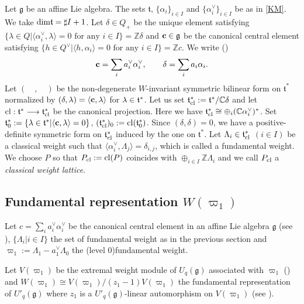 Let ${\mathfrak g}$ be an affine Lie algebra. 
The sets $\mathfrak t$, 
$\{{\alpha}_i\}_{i\in I}$ 
and $\{{\alpha}^\vee_i\}_{i\in I}$ be as in \ref{KM}. 
We take ${\rm dim}\mathfrak t=\sharp I+1$.
Let ${\delta}\in Q_+$ be the unique element 
satisfying $\{{\lambda}\in Q|{\langle} {\alpha}^\vee_i,{\lambda}{\rangle}=0
\text{ for any }i\in I\}={\mathbb Z}{\delta}$
and ${\bf c}\in {\mathfrak g}$ be the canonical central element
satisfying $\{h\in Q^\vee|{\langle} h,{\alpha}_i{\rangle}=0
\text{ for any }i\in I\}={\mathbb Z} c$.
We write (\cite[6.1]{Kac})
\[
{\bf c}=\sum_i a_i^\vee {\alpha}^\vee_i,{\qquad}
{\delta}=\sum_i a_i{\alpha}_i.
\]
Let $({\quad},{\quad})$ be the non-degenerate
$W$-invariant symmetric bilinear form on $\mathfrak t^*$
normalized by $({\delta},{\lambda})={\langle} {\bf c},{\lambda}{\rangle}$
for ${\lambda}\in\frak t^*$.
Let us set ${\mathfrak t}^*_{\rm cl}:={\mathfrak t}^*/{\mathbb C}{\delta}$ and let
${\rm cl}:{\mathfrak t}^*\longrightarrow {\mathfrak t}^*_{\rm cl}$
be the canonical projection. 
Here we have 
${\mathfrak t}^*_{\rm cl}\cong \oplus_i({\mathbb C} {\alpha}^\vee_i)^*$.
Set ${\mathfrak t}^*_0:=\{{\lambda}\in{\mathfrak t}^*|{\langle} {\bf c},{\lambda}{\rangle}=0\}$,
$({\mathfrak t}^*_{\rm cl})_0:={\rm cl}({\mathfrak t}^*_0)$. 
Since $({\delta},{\delta})=0$, we have a positive-definite
symmetric form on ${\mathfrak t}^*_{\rm cl}$ 
induced by the one on 
${\mathfrak t}^*$. 
Let ${\Lambda}_i\in {\mathfrak t}^*_{\rm cl}$ $(i\in I)$ be a classical 
weight such that ${\langle} {\alpha}^\vee_i,{\Lambda}_j{\rangle}={\delta}_{i,j}$, which 
is called a fundamental weight.
We choose 
$P$ so that $P_{\rm cl}:={\rm cl}(P)$ coincides with 
$\oplus_{i\in I}{\mathbb Z}{\Lambda}_i$ and 
we call $P_{\rm cl}$ a 
{\it classical weight lattice}.

\subsection{Fundamental representation 
$W(\varpi_1)$}
\label{fundamental}

Let $c=\sum_{i}a_i^\vee {\alpha}^\vee_i$ be the canonical
central element in an affine Lie algebra ${\mathfrak g}$
(see \cite[6.1]{Kac}), 
$\{{\Lambda}_i|i\in I\}$ the set of fundamental 
weight as in the previous section
and $\varpi_1:={\Lambda}_1-a^\vee_1{\Lambda}_0$ the
(level 0)fundamental weight.

Let $V(\varpi_1)$ be the extremal weight module
of ${U_q({\mathfrak g})}$
associated with $\varpi_1$ (\cite{K0}) and 
$W(\varpi_1)\cong 
V(\varpi_1)/(z_1-1)V(\varpi_1)$ the 
fundamental representation of ${U'_q({\mathfrak g})}$
where $z_1$ is a 
${U'_q({\mathfrak g})}$-linear automorphism on $V(\varpi_1)$
 (see \cite[Sect 5.]{K0}). 

